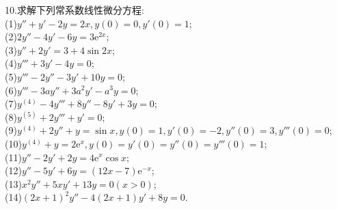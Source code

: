 \documentclass[titlepage,11pt,a4paper,twoside]{report}
\newcommand\e{\mathrm{e}}
\begin{document}
10.求解下列常系数线性微分方程:\\
(1)$y''+y'-2y=2x,y(0)=0,y'(0)=1$;\\
(2)$2y''-4y'-6y=3\e^{2x}$;\\
(3)$y''+2y'=3+4\sin 2x$;\\
(4)$y'''+3y'-4y=0$;\\
(5)$y'''-2y''-3y'+10y=0$;\\
(6)$y'''-3ay''+3a^2y'-a^3y=0$;\\
(7)$y^{(4)}-4y'''+8y''-8y'+3y=0$;\\
(8)$y^{(5)}+2y'''+y'=0$;\\
(9)$y^{(4)}+2y''+y=\sin x,y(0)=1,y'(0)=-2,y''(0)=3,y'''(0)=0$;\\
(10)$y^{(4)}+y=2\e^x,y(0)=y'(0)=y''(0)=y'''(0)=1$;\\
(11)$y''-2y'+2y=4\e^x\cos x$;\\
(12)$y''-5y'+6y=(12x-7)\e^{-x}$;\\
(13)$x^2y''+5xy'+13y=0(x>0)$;\\
(14)$(2x+1)^2y''-4(2x+1)y'+8y=0$.
\end{document}

